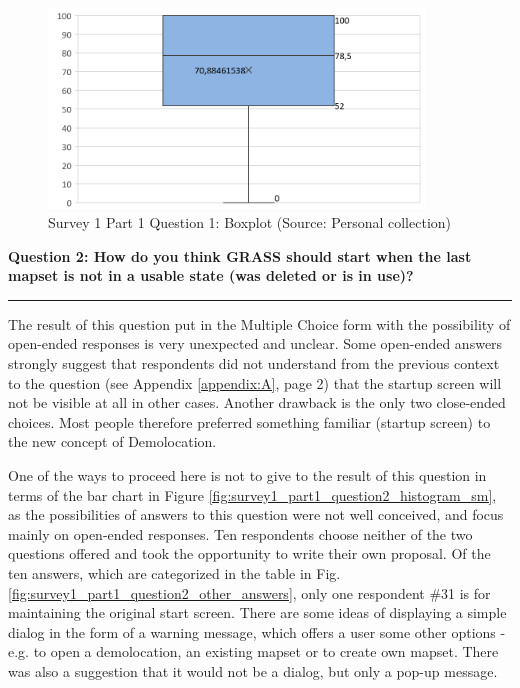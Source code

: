 \documentclass[a4paper,10pt,twoside]{article}
\begin{document}
\vspace{0.3cm}
\begin{figure}[hbt!] 
\begin{center}
\includegraphics[width=10cm]{../surveys/analyzed_data/survey1_part1_question1_excel_boxplot.png} 
\caption[Survey 1 Part 1 Question 1: Boxplot]{Survey 1 Part 1 Question 1: Boxplot (Source: Personal collection)}
\label{fig:survey1_part1_question1_boxplot}
\end{center}
\end{figure}

\newpage
\noindent \textbf{Question 2: How do you think GRASS should start when the last mapset is not in a usable state (was deleted or is in use)?}
\par\noindent\rule{\textwidth}{0.4pt}
\noindent The result of this question put in the Multiple Choice form with the possibility of open-ended responses is very unexpected and unclear. Some open-ended answers strongly suggest that respondents did not understand from the previous context to the question (see Appendix \ref{appendix:A}, page 2) that the startup screen will not be visible at all in other cases. Another drawback is the only two close-ended choices. Most people therefore preferred something familiar (startup screen) to the new concept of Demolocation.

One of the ways to proceed here is not to give to the result of this question in terms of the bar chart in Figure \ref{fig:survey1_part1_question2_histogram_sm}, as the possibilities of answers to this question were not well conceived, and focus mainly on open-ended responses. Ten respondents choose neither of the two questions offered and took the opportunity to write their own proposal. Of the ten answers, which are categorized in the table in Fig. \ref{fig:survey1_part1_question2_other_answers}, only one respondent \#31 is for maintaining the original start screen. There are some ideas of displaying a simple dialog in the form of a warning message, which offers a user some other options - e.g. to open a demolocation, an existing mapset or to create own mapset. There was also a suggestion that it would not be a dialog, but only a pop-up message.
\end{document}
